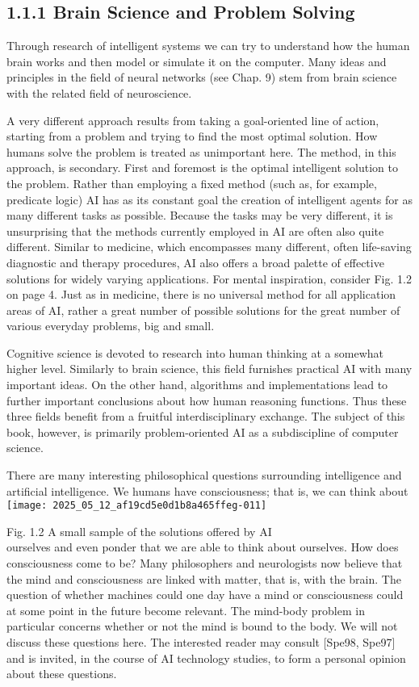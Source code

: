 \documentclass[10pt]{article}
\begin{document}
\subsection*{1.1.1 Brain Science and Problem Solving}
Through research of intelligent systems we can try to understand how the human brain works and then model or simulate it on the computer. Many ideas and principles in the field of neural networks (see Chap. 9) stem from brain science with the related field of neuroscience.

A very different approach results from taking a goal-oriented line of action, starting from a problem and trying to find the most optimal solution. How humans solve the problem is treated as unimportant here. The method, in this approach, is secondary. First and foremost is the optimal intelligent solution to the problem. Rather than employing a fixed method (such as, for example, predicate logic) AI has as its constant goal the creation of intelligent agents for as many different tasks as possible. Because the tasks may be very different, it is unsurprising that the methods currently employed in AI are often also quite different. Similar to medicine, which encompasses many different, often life-saving diagnostic and therapy procedures, AI also offers a broad palette of effective solutions for widely varying applications. For mental inspiration, consider Fig. 1.2 on page 4. Just as in medicine, there is no universal method for all application areas of AI, rather a great number of possible solutions for the great number of various everyday problems, big and small.

Cognitive science is devoted to research into human thinking at a somewhat higher level. Similarly to brain science, this field furnishes practical AI with many important ideas. On the other hand, algorithms and implementations lead to further important conclusions about how human reasoning functions. Thus these three fields benefit from a fruitful interdisciplinary exchange. The subject of this book, however, is primarily problem-oriented AI as a subdiscipline of computer science.

There are many interesting philosophical questions surrounding intelligence and artificial intelligence. We humans have consciousness; that is, we can think about\\
\texttt{[image: 2025\_05\_12\_af19cd5e0d1b8a465ffeg-011]}

Fig. 1.2 A small sample of the solutions offered by AI\\
ourselves and even ponder that we are able to think about ourselves. How does consciousness come to be? Many philosophers and neurologists now believe that the mind and consciousness are linked with matter, that is, with the brain. The\\[0pt]
question of whether machines could one day have a mind or consciousness could at some point in the future become relevant. The mind-body problem in particular concerns whether or not the mind is bound to the body. We will not discuss these questions here. The interested reader may consult [Spe98, Spe97] and is invited, in the course of AI technology studies, to form a personal opinion about these questions.
\end{document}
